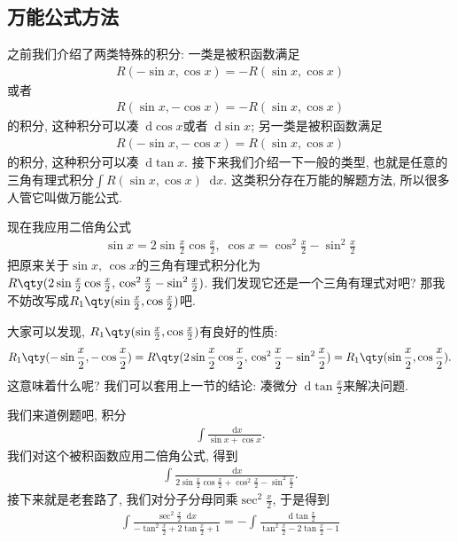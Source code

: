 \documentclass{ctexbook}
\newcommand*{\dif}{\mathop{}\!\mathrm{d}}
\begin{document}
{\subsection{万能公式方法}
之前我们介绍了两类特殊的积分: 一类是被积函数满足
\begin{align*}
R(-\sin{x},\cos{x})=-R(\sin{x},\cos{x})
\end{align*}
或者
\begin{align*}
R(\sin{x},-\cos{x})=-R(\sin{x},\cos{x})
\end{align*}
的积分, 这种积分可以凑$\dif{\cos{x}}$或者$\dif{\sin{x}}$; 另一类是被积函数满足
\begin{align*}
R(-\sin{x},-\cos{x})=R(\sin{x},\cos{x})
\end{align*}
的积分, 这种积分可以凑$\dif{\tan{x}}$. 接下来我们介绍一下一般的类型, 也就是任意的三角有理式积分$\int R(\sin{x},\cos{x})\dif{x}$. 这类积分存在万能的解题方法, 所以很多人管它叫做万能公式. \par
现在我应用二倍角公式
\begin{align*}
\sin{x}=2\sin{\frac{x}{2}}\cos{\frac{x}{2}},\;\cos{x}=\cos^{2}{\frac{x}{2}}-\sin^{2}{\frac{x}{2}}
\end{align*}
把原来关于$\sin{x},\,\cos{x}$的三角有理式积分化为$R\qty(2\sin{\frac{x}{2}}\cos{\frac{x}{2}},\,\cos^{2}{\frac{x}{2}}-\sin^{2}{\frac{x}{2}})$. 我们发现它还是一个三角有理式对吧? 那我不妨改写成$R_{1}\qty(\sin{\frac{x}{2}},\cos{\frac{x}{2}})$吧. \par
大家可以发现, $R_{1}\qty(\sin{\frac{x}{2}},\cos{\frac{x}{2}})$有良好的性质: 
\begin{align*}
R_{1}\qty(-\sin{\frac{x}{2}},-\cos{\frac{x}{2}})=R\qty(2\sin{\frac{x}{2}}\cos{\frac{x}{2}},\,\cos^{2}{\frac{x}{2}}-\sin^{2}{\frac{x}{2}})=R_{1}\qty(\sin{\frac{x}{2}},\cos{\frac{x}{2}})
.\end{align*}
这意味着什么呢? 我们可以套用上一节的结论: 凑微分$\dif{\tan{\frac{x}{2}}}$来解决问题. \par
我们来道例题吧, 积分
\begin{align*}
\int\frac{\dif{x}}{\sin{x}+\cos{x}}
.\end{align*}
我们对这个被积函数应用二倍角公式, 得到
\begin{align*}
\int\frac{\dif{x}}{2\sin{\frac{x}{2}}\cos{\frac{x}{2}}+\cos^{2}{\frac{x}{2}}-\sin^{2}{\frac{x}{2}}}
.\end{align*}
接下来就是老套路了, 我们对分子分母同乘$\sec^{2}{\frac{x}{2}}$, 于是得到
\begin{align*}
\int\frac{\sec^{2}{\frac{x}{2}}\dif{x}}{-\tan^{2}{\frac{x}{2}}+2\tan{\frac{x}{2}}+1}=-\int\frac{\dif{\tan{\frac{x}{2}}}}{\tan^{2}{\frac{x}{2}}-2\tan{\frac{x}{2}}-1}

\end{align*}}
\end{document}

